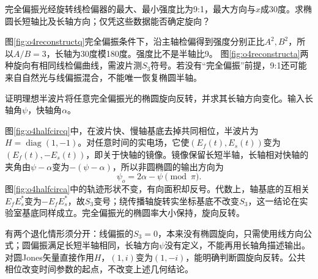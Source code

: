 \begin{exercise}\label{ex:o4ellipsereconstruct}
完全偏振光经旋转线检偏器的最大、最小强度比为9:1，最大方向与$x$成30度。求椭圆长短轴比及长轴方向；仅凭这些数据能否确定旋向？
\end{exercise}
\begin{solution}
图\ref{fig:o4reconstructq}完全偏振条件下，沿主轴检偏得到强度分别正比$A^2,B^2$，所以$A/B=3$，长轴为30度模180度。强度比不是半轴比9。
图\ref{fig:o4reconstructa}两种旋向有相同线检偏曲线，需波片测$S_3$符号。若没有“完全偏振”前提，9:1还可能来自自然光与线偏振混合，不能唯一恢复椭圆半轴。
\end{solution}

\begin{exercise}\label{ex:o4halfcircular}
证明理想半波片将任意完全偏振光的椭圆旋向反转，并求其长轴方向变化。输入长轴角$\psi$，快轴角$\alpha$。
\end{exercise}
\begin{solution}
图\ref{fig:o4halfcircq}中，在波片快、慢轴基底去掉共同相位，半波片为$H=\operatorname{diag}(1,-1)$。对任意时间的实电场，它使$(E_f(t),E_s(t))$变为$(E_f(t),-E_s(t))$，即关于快轴的镜像。镜像保留长短半轴，长轴相对快轴的夹角由$\psi-\alpha$变为$-(\psi-\alpha)$，所以非圆椭圆的输出方向为
\[
 \psi_o=2\alpha-\psi\pmod\pi.
\]
图\ref{fig:o4halfcirca}中的轨迹形状不变，有向面积却反号。代数上，轴基底的互相关$E_fE_s^*$变为$-E_fE_s^*$，故$S_3$变号；绕传播轴旋转实坐标基底不改变$S_3$，这一结论在实验室基底同样成立。完全偏振光的椭圆率大小保持，旋向反转。

有两个退化情形须分开：线偏振的$S_3=0$，本来没有椭圆旋向，只需使用线方向公式；圆偏振满足长短半轴相同，长轴方向$\psi$没有定义，不能再用长轴角描述输出。对圆Jones矢量直接作用$H$，$(1,i)$变为$(1,-i)$，能明确判断圆旋向反转。公共相位改变时间参数的起点，不改变上述几何结论。
\end{solution}

